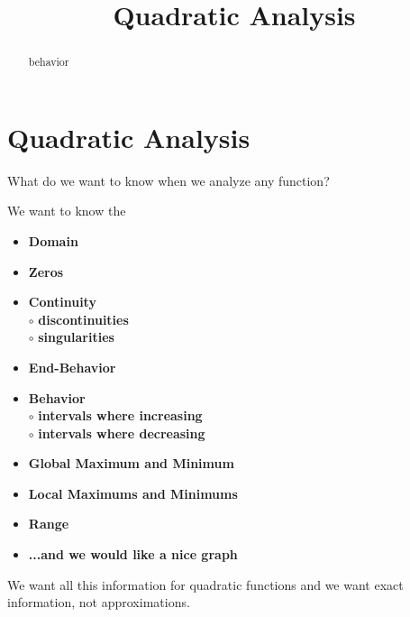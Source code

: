 \documentclass{ximera}
\title{Quadratic Analysis}
\begin{document}
\begin{abstract}
behavior
\end{abstract}
\maketitle




 
 



\section*{Quadratic Analysis}

What do we want to know when we analyze any function?

We want to know the 
\begin{itemize}
     \item \textbf{\textcolor{red!70!black}{Domain}} 
     \item \textbf{\textcolor{red!70!black}{Zeros}} 
     \item \textbf{\textcolor{red!70!black}{Continuity}} \\
     \text{    }$\circ$ \textbf{\textcolor{purple!85!blue}{discontinuities}}\\
     \text{    }$\circ$ \textbf{\textcolor{purple!85!blue}{singularities}}\\
     \item \textbf{\textcolor{red!70!black}{End-Behavior}} 
     \item \textbf{\textcolor{red!70!black}{Behavior}} \\
     \text{    }$\circ$ \textbf{\textcolor{purple!85!blue}{intervals where increasing}}\\
     \text{    }$\circ$ \textbf{\textcolor{purple!85!blue}{intervals where decreasing}}\\
     \item \textbf{\textcolor{red!70!black}{Global Maximum and Minimum}} 
     \item \textbf{\textcolor{red!70!black}{Local Maximums and Minimums}} 
     \item \textbf{\textcolor{red!70!black}{Range}} 
     \item \textbf{\textcolor{blue!55!black}{...and we would like a nice graph}} 
\end{itemize}


We want all this information for quadratic functions and we want exact information, not approximations. 
\end{document}
